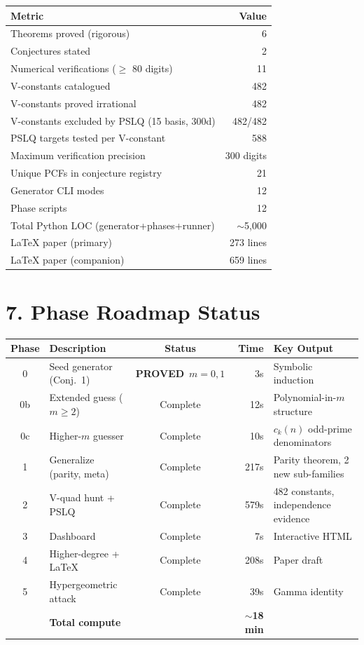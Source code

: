 \documentclass[11pt]{article}
\newcommand{\PROVED}{\textcolor{proved}{\textbf{PROVED}}}
\begin{document}
\begin{center}
\begin{tabular}{@{} l r @{}}
\toprule
Metric & Value \\
\midrule
Theorems proved (rigorous) & 6 \\
Conjectures stated & 2 \\
Numerical verifications ($\ge$ 80 digits) & 11 \\
V-constants catalogued & 482 \\
V-constants proved irrational & 482 \\
V-constants excluded by PSLQ (15 basis, 300d) & 482/482 \\
PSLQ targets tested per V-constant & 588 \\
Maximum verification precision & 300 digits \\
Unique PCFs in conjecture registry & 21 \\
Generator CLI modes & 12 \\
Phase scripts & 12 \\
Total Python LOC (generator+phases+runner) & $\sim$5{,}000 \\
LaTeX paper (primary) & 273 lines \\
LaTeX paper (companion) & 659 lines \\
\bottomrule
\end{tabular}
\end{center}

\section*{7. Phase Roadmap Status}

\begin{center}
\small
\begin{tabular}{@{} c l c r l @{}}
\toprule
Phase & Description & Status & Time & Key Output \\
\midrule
0   & Seed generator (Conj.\ 1) & \PROVED\ $m{=}0,1$ & 3s & Symbolic induction \\
0b  & Extended guess ($m \ge 2$) & Complete & 12s & Polynomial-in-$m$ structure \\
0c  & Higher-$m$ guesser         & Complete & 10s & $c_k(n)$ odd-prime denominators \\
1   & Generalize (parity, meta)  & Complete & 217s & Parity theorem, 2 new sub-families \\
2   & V-quad hunt + PSLQ         & Complete & 579s & 482 constants, independence evidence \\
3   & Dashboard                  & Complete & 7s & Interactive HTML \\
4   & Higher-degree + \LaTeX     & Complete & 208s & Paper draft \\
5   & Hypergeometric attack      & Complete & 39s & Gamma identity \\
\midrule
    & \textbf{Total compute}     &          & \textbf{$\sim$18 min} & \\
\bottomrule
\end{tabular}
\end{center}
\end{document}
